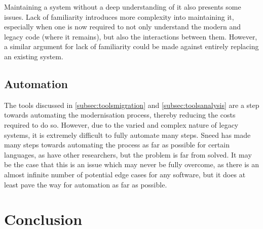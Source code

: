 \documentclass[12pt,journal,compsoc]{IEEEtran}
\begin{document}
Maintaining a system without a deep understanding of it also presents some issues. Lack of familiarity introduces more complexity into maintaining it, especially when one is now required to not only understand the modern and legacy code (where it remains), but also the interactions between them. However, a similar argument for lack of familiarity could be made against entirely replacing an existing system\cite{Almonaies2010}.

\subsection{Automation}
\label{subsec:automation}
The tools discussed in \autoref{subsec:toolsmigration} and \autoref{subsec:toolsanalysis} are a step towards automating the modernisation process, thereby reducing the costs required to do so. However, due to the varied and complex nature of legacy systems, it is extremely difficult to fully automate many steps. Sneed has made many steps towards automating the process as far as possible for certain languages\cite{Sneed2013,Sneed2011,Sneed2008,Sneed2009,Sneed1996,Sneed2001}, as have other researchers\cite{Deursen1998,Aversano2001,Chiang2001,Wu2005,O'Brien2005,Distante2006}, but the problem is far from solved. It may be the case that this is an issue which may never be fully overcome, as there is an almost infinite number of potential edge cases for any software, but it does at least pave the way for automation as far as possible.

\section{Conclusion}
\label{sec:conclusion}


\appendices



\ifCLASSOPTIONcompsoc
\end{document}
